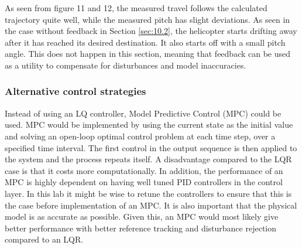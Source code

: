 As seen from figure 11 and 12, the measured travel follows the calculated trajectory quite well, while the measured pitch has slight deviations. As seen in the case without feedback in Section \ref{sec:10.2}, the helicopter starts drifting away after it has reached its desired destination. It also starts off with a small pitch angle. This does not happen in this section, meaning that feedback can be used as a utility to compensate for disturbances and model inaccuracies. 

\subsubsection{Alternative control strategies}
Instead of using an LQ controller, Model Predictive Control (MPC) could be used. MPC would be implemented by using the current state as the initial value and solving an open-loop optimal control problem at each time step, over a specified time interval. The first control in the output sequence is then applied to the system and the process repeats itself. A disadvantage compared to the LQR case is that it costs more computationally. In addition, the performance of an MPC is highly dependent on having well tuned PID controllers in the control layer. In this lab it might be wise to retune the controllers to ensure that this is the case before implementation of an MPC. It is also important that the physical model is as accurate as possible. Given this, an MPC would most likely give better performance with better reference tracking and disturbance rejection compared to an LQR.   \cite{Foss2016} 





